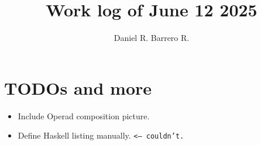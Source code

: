 \documentclass{amsart}
\title{Work log of June 12 2025}
\author{Daniel R. Barrero R.}
\begin{document}
\maketitle

\section{TODOs and more}

\begin{itemize}
	\item Include Operad composition picture.
	\item Define Haskell listing manually. \texttt{<-- couldn't.}
\end{itemize}

\newpage


\end{document}
